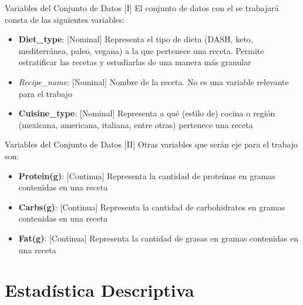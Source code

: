 \documentclass{beamer}
\begin{document}
    \begin{frame}{Variables del Conjunto de Datos [I]}
        El conjunto de datos con el se trabajará consta de 
        las siguientes variables:
        \begin{itemize}
            \item<2->\textbf{Diet\_type}: [Nominal] Representa 
            el tipo de dieta (DASH, keto, mediterránea, paleo, vegana) 
            a la que pertenece una receta. Permite estratificar las recetas 
            y estudiarlas de una manera más granular
            \item<3->\emph{Recipe\_name}: [Nominal] Nombre de 
            la receta. No es una variable relevante para el trabajo
            \item<4->\textbf{Cuisine\_type}: [Nominal] Representa 
            a qué (estilo de) cocina o región (mexicana, americana, 
            italiana, entre otras) pertenece una receta
        \end{itemize}
    \end{frame}

    \begin{frame}{Variables del Conjunto de Datos [II]}
        Otras variables que serán eje para el trabajo son:
        \begin{itemize}
            \item<1->\textbf{Protein(g)}: [Continua] Representa la 
            cantidad de proteínas en gramas contenidas en una receta
            \item<2->\textbf{Carbs(g)}: [Continua] Representa la 
            cantidad de carbohidratos en gramas contenidas en una receta
            \item<3->\textbf{Fat(g)}: [Continua] Representa la 
            cantidad de grasas en gramas contenidas en una receta
        \end{itemize}
    \end{frame}

    \section{Estadística Descriptiva}
\end{document}
